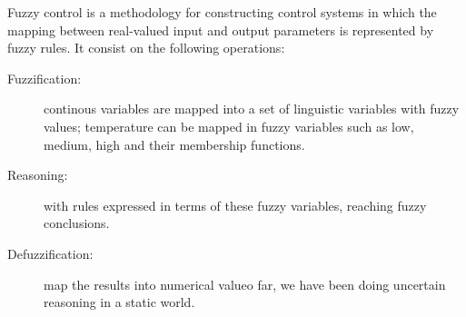 Fuzzy control is a methodology for constructing control systems in which the mapping
between real-valued input and output parameters is represented by fuzzy rules.\newline
It consist on the following operations:
\begin{description}
    \item [Fuzzification: ] continous variables are mapped into a set of linguistic variables
	    with fuzzy values; temperature can be mapped in fuzzy variables such as 
	    low, medium, high and their membership functions.
    \item [Reasoning: ] with rules expressed in terms of these fuzzy variables,
	    reaching fuzzy conclusions.
    \item [Defuzzification: ] map the results into numerical valueo far,
	   we have been doing uncertain reasoning in a static world.
\end{description}
